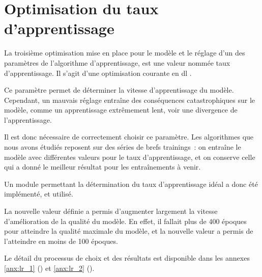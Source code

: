 \section{Optimisation du taux d'apprentissage}\label{lr_opti_papud}
La troisième optimisation mise en place pour le modèle et le réglage d'un des paramètres de l'algorithme d'apprentissage, est une valeur nommée \og taux d'apprentissage\fg{}. Il s'agit d'une optimisation courante en \gls{dl} \autocite{LearningRateOptimisation}.

Ce paramètre permet de déterminer la vitesse d'apprentissage du modèle.
Cependant, un mauvais réglage entraîne des conséquences catastrophiques sur le modèle, comme un apprentissage extrêmement lent, voir une divergence de l'apprentissage.

Il est donc nécessaire de correctement choisir ce paramètre.
Les algorithmes que nous avons étudiés reposent sur des séries de brefs \glspl{training}~: on entraîne le modèle avec différentes valeurs pour le taux d'apprentissage, et on conserve celle qui a donné le meilleur résultat pour les entraînements à venir.

Un module permettant la détermination du taux d'apprentissage idéal a donc été implémenté, et utilisé.

La nouvelle valeur définie a permis d'augmenter largement la vitesse d'amélioration de la qualité du modèle. En effet, il fallait plus de 400 époques pour atteindre la qualité maximale du modèle, et la nouvelle valeur a permis de l'atteindre en moins de 100 époques. %

Le détail du processus de choix et des résultats est disponible dans les annexes \ref{anx:lr_1} () et \ref{anx:lr_2} ().
